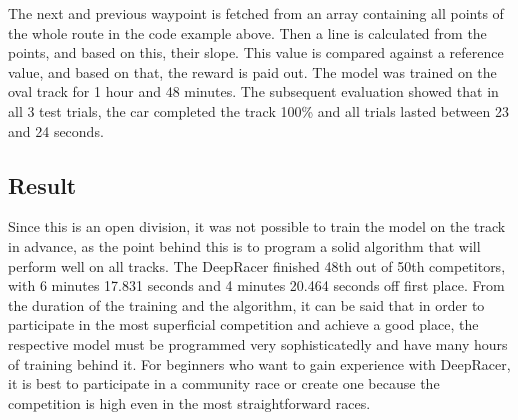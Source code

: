 The next and previous waypoint is fetched from an array containing all points of the whole route in the code example above. Then a line is calculated from the points, and based on this, their slope. This value is compared against a reference value, and based on that, the reward is paid out. The model was trained on the oval track for 1 hour and 48 minutes. The subsequent evaluation showed that in all 3 test trials, the car completed the track 100\% and all trials lasted between 23 and 24 seconds.

\subsection{Result}
Since this is an open division, it was not possible to train the model on the track in advance, as the point behind this is to program a solid algorithm that will perform well on all tracks. The DeepRacer finished 48th out of 50th competitors, with 6 minutes 17.831 seconds and 4 minutes 20.464 seconds off first place.  From the duration of the training and the algorithm, it can be said that in order to participate in the most superficial competition and achieve a good place, the respective model must be programmed very sophisticatedly and have many hours of training behind it. For beginners who want to gain experience with DeepRacer, it is best to participate in a community race or create one because the competition is high even in the most straightforward races.